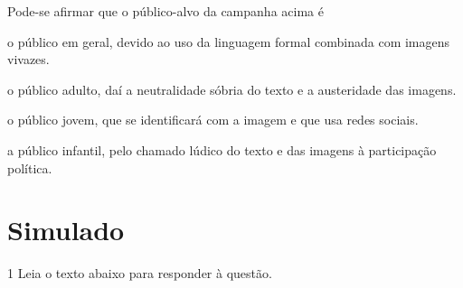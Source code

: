 Pode-se afirmar que o público-alvo da campanha acima é

\begin{escolha}

    \item o público em geral, devido ao uso da linguagem formal combinada com imagens vivazes.
    \item o público adulto, daí a neutralidade sóbria do texto e a austeridade das imagens. 
    \item o público jovem, que se identificará com a imagem e que usa redes sociais.   
    \item a público infantil, pelo chamado lúdico do texto e das imagens à participação política. 

\end{escolha}


\chapter[Simulado 2]{Simulado}

\num{1} Leia o texto abaixo para responder à questão.

